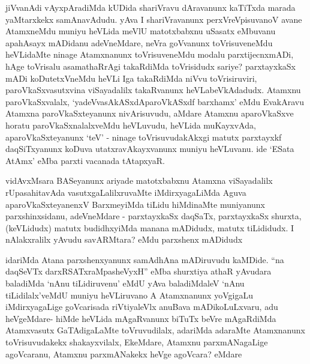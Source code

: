 \begin{artha}
jiVvanAdi vAyxpAradiMda kUDida shariVravu dAravanunx kaTiTxda marada yaMtarxkekx samAnavAdudu. yAva I shariVravanunx perxVreVpisuvanoV avane AtamxneMdu muniyu heVLida meVlU matotxbabxnu uSasatx eMbuvanu apahAsayx mADidanu \mdash  adeVneMdare, neVra goVvanunx toVrisuveneMdu heVLidaMte ninage Atamxnanunx toVrisuveneMdu modalu parxtijecnxmADi, hAge toVrisalu asamathaRrAgi takaRdiMda toVrisidudx sariye? parxtayxkaSx mADi koDutetxVneMdu heVLi Iga takaRdiMda niVvu toVrisiruviri, paroVkaSxvasutxvina viSayadalilx takaRvanunx heVLabeVkAdadudx. Atamxnu paroVkaSxvalalx, `yadeVvasAkASxdAparoVkASxdf barxhamx' eMdu EvakAravu Atamxna paroVkaSxteyanunx nivArisuvudu, aMdare Atamxnu aparoVkaSxve horatu paroVkaSxnalalxveMdu heVLuvudu, heVLida muKayxvAda, aparoVkaSxteyanunx `teV' - ninage toVrisuvudakAkxgi matutx parxtayxkf daqSiTxyanunx koDuva utatxravAkayxvanunx muniyu heVLuvanu. ide `ESata AtAmx' eMba parxti vacanada tAtapxyaR.
\end{artha}


\begin{artha}
vidAvxMsara BASeyanunx ariyade matotxbabxnu Atamxna viSayadalilx rUpasahitavAda vasutxgaLalilxruvaMte iMdirxyagaLiMda Aguva aparoVkaSxteyanenxV BarxmeyiMda tiLidu hiMdinaMte muniyanunx parxshinxsidanu, adeVneMdare - parxtayxkaSx daqSaTx, parxtayxkaSx shurxta, (keVLidudx) matutx budidhxyiMda manana mADidudx, matutx tiLididudx. I nAlakxralilx yAvudu savARMtara? eMdu parxshenx mADidudx 
\end{artha}


\begin{artha}
idariMda Atana parxshenxyanunx samAdhAna mADiruvudu kaMDide. ``na daqSeVTx darxRSATxraMpasheVyxH'' eMba shurxtiya athaR \mdash  yAvudara baladiMda `nAnu tiLidiruvenu' eMdU yAva baladiMdaleV `nAnu tiLidilalx'veMdU muniyu heVLiruvano A Atamxnanunx yoVgigaLu iMdirxyagaLige goVcarisada riVtiyaleVlx anuBava mADikoLuLxvaru, adu heVgeMdare- hiMde heVLida mAgaRvanunx biTuTx beVre mAgaRdiMda Atamxvasutx GaTAdigaLaMte toVruvudilalx, adariMda adaraMte Atamxnanunx toVrisuvudakekx shakayxvilalx, EkeMdare, Atamxnu parxmANagaLige agoVcaranu, Atamxnu parxmANakekx heVge agoVcara? eMdare \mdash  
\end{artha}


